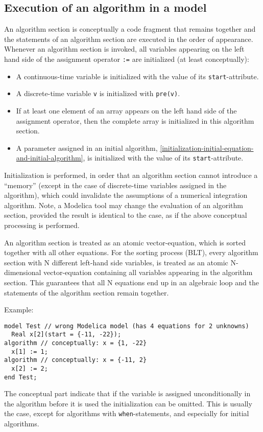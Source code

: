 \subsection{Execution of an algorithm in a model}\label{execution-of-an-algorithm-in-a-model}

An algorithm section is conceptually a code fragment that remains
together and the statements of an algorithm section are executed in the
order of appearance. Whenever an algorithm section is invoked, all
variables appearing on the left hand side of the assignment operator
\lstinline!:=! are initialized (at least conceptually):
\begin{itemize}
\item
  A continuous-time variable is initialized with the value of its \lstinline!start!-attribute.
\item
  A discrete-time variable \lstinline!v! is initialized with \lstinline!pre(v)!.
\item
  If at least one element of an array appears on the left hand side of the assignment operator, then the complete array is initialized in this algorithm section.
\item
  A parameter assigned in an initial algorithm, \cref{initialization-initial-equation-and-initial-algorithm}, is initialized with the value of its \lstinline!start!-attribute.
\end{itemize}

\begin{nonnormative}
Initialization is performed, in order that an algorithm section
cannot introduce a ``memory'' (except in the case of discrete-time variables assigned in the algorithm), which could invalidate the assumptions of a
numerical integration algorithm. Note, a Modelica tool may change the
evaluation of an algorithm section, provided the result is identical to
the case, as if the above conceptual processing is performed.

An algorithm section is treated as an atomic vector-equation,
which is sorted together with all other equations. For the sorting
process (BLT), every algorithm section with N different left-hand side
variables, is treated as an atomic N-dimensional vector-equation
containing all variables appearing in the algorithm section. This
guarantees that all N equations end up in an algebraic loop and the
statements of the algorithm section remain together.

Example:
\begin{lstlisting}[language=modelica]
model Test // wrong Modelica model (has 4 equations for 2 unknowns)
  Real x[2](start = {-11, -22});
algorithm // conceptually: x = {1, -22}
  x[1] := 1;
algorithm // conceptually: x = {-11, 2}
  x[2] := 2;
end Test;
\end{lstlisting}

The conceptual part indicate that if the variable is assigned unconditionally in the algorithm before it is used the initialization can be omitted.
This is usually the case, except for algorithms with \lstinline!when!-statements, and especially for initial algorithms.
\end{nonnormative}

